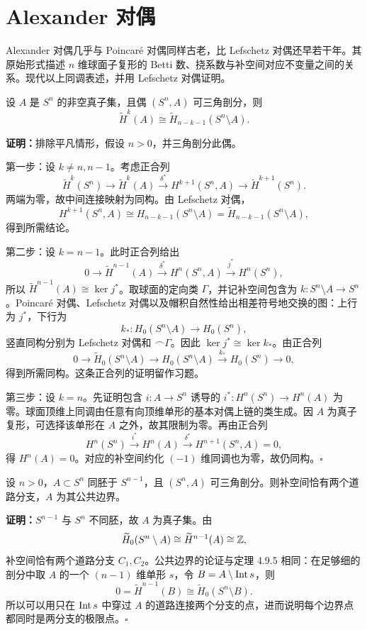 \section{Alexander 对偶}
Alexander 对偶几乎与 Poincaré 对偶同样古老，比 Lefschetz 对偶还早若干年。其原始形式描述 $n$ 维球面子复形的 Betti 数、挠系数与补空间对应不变量之间的关系。现代以上同调表述，并用 Lefschetz 对偶证明。

设 $A$ 是 $S^n$ 的非空真子集，且偶 $(S^n,A)$ 可三角剖分，则
\[\widetilde H^k(A)\cong\widetilde H_{n-k-1}(S^n\setminus A).\]

\textbf{证明：}排除平凡情形，假设 $n>0$，并三角剖分此偶。

第一步：设 $k\ne n,n-1$。考虑正合列
\[\widetilde H^k(S^n)\to\widetilde H^k(A)\xrightarrow{\delta^*}H^{k+1}(S^n,A)
\to\widetilde H^{k+1}(S^n).\]
两端为零，故中间连接映射为同构。由 Lefschetz 对偶，
\[H^{k+1}(S^n,A)\cong H_{n-k-1}(S^n\setminus A)
=\widetilde H_{n-k-1}(S^n\setminus A),\]
得到所需结论。

第二步：设 $k=n-1$。此时正合列给出
\[0\to\widetilde H^{n-1}(A)\xrightarrow{\delta^*}H^n(S^n,A)
\xrightarrow{j^*}H^n(S^n),\]
所以 $\widetilde H^{n-1}(A)\cong\ker j^*$。取球面的定向类 $\Gamma$，并记补空间包含为 $k:S^n\setminus A\to S^n$。Poincaré 对偶、Lefschetz 对偶以及帽积自然性给出相差符号地交换的图：上行为 $j^*$，下行为
\[k_*:H_0(S^n\setminus A)\to H_0(S^n),\]
竖直同构分别为 Lefschetz 对偶和 $\frown\Gamma$。因此 $\ker j^*\cong\ker k_*$。由正合列
\[0\to\widetilde H_0(S^n\setminus A)\to H_0(S^n\setminus A)
\xrightarrow{k_*}H_0(S^n)\to0,\]
得到所需同构。这条正合列的证明留作习题。

第三步：设 $k=n$。先证明包含 $i:A\to S^n$ 诱导的 $i^*:H^n(S^n)\to H^n(A)$ 为零。球面顶维上同调由任意有向顶维单形的基本对偶上链的类生成。因 $A$ 为真子复形，可选择该单形在 $A$ 之外，故其限制为零。再由正合列
\[H^n(S^n)\xrightarrow{i^*}H^n(A)\xrightarrow{\delta^*}H^{n+1}(S^n,A)=0,\]
得 $H^n(A)=0$。对应的补空间约化 $(-1)$ 维同调也为零，故仍同构。\hfill$\square$

设 $n>0$，$A\subset S^n$ 同胚于 $S^{n-1}$，且 $(S^n,A)$ 可三角剖分。则补空间恰有两个道路分支，$A$ 为其公共边界。

\textbf{证明：}$S^{n-1}$ 与 $S^n$ 不同胚，故 $A$ 为真子集。由
\[\widetilde H_0(S^n\setminus A)\cong\widetilde H^{n-1}(A)\cong\mathbb{Z},\]
补空间恰有两个道路分支 $C_1,C_2$。公共边界的论证与定理 4.9.5 相同：在足够细的剖分中取 $A$ 的一个 $(n-1)$ 维单形 $s$，令 $B=A\setminus\operatorname{Int} s$，则
\[0=\widetilde H^{n-1}(B)\cong\widetilde H_0(S^n\setminus B).\]
所以可以用只在 $\operatorname{Int} s$ 中穿过 $A$ 的道路连接两个分支的点，进而说明每个边界点都同时是两分支的极限点。\hfill$\square$

